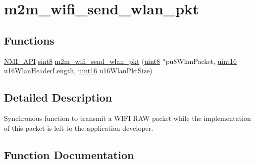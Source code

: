 \hypertarget{group__SendWlanPktFn}{}\section{m2m\+\_\+wifi\+\_\+send\+\_\+wlan\+\_\+pkt}
\label{group__SendWlanPktFn}
\subsection*{Functions}
\begin{DoxyCompactItemize}
\item 
\hyperlink{group__BSPDefine_gaecc0323d771e41ef81a76b5f12783e22}{N\+M\+I\+\_\+\+A\+PI} \hyperlink{group__DataT_gae35f10ffd0ac8dd2bc3e794da9bdfbc7}{sint8} \hyperlink{group__SendWlanPktFn_gaaa0ae5733351b8946ad3c6737ae768fe}{m2m\+\_\+wifi\+\_\+send\+\_\+wlan\+\_\+pkt} (\hyperlink{group__DataT_ga4df709a77647e870bbf1d955b8edc9a6}{uint8} $\ast$pu8\+Wlan\+Packet, \hyperlink{group__DataT_ga1daa745171fc6e31d942c161422a76f9}{uint16} u16\+Wlan\+Header\+Length, \hyperlink{group__DataT_ga1daa745171fc6e31d942c161422a76f9}{uint16} u16\+Wlan\+Pkt\+Size)
\end{DoxyCompactItemize}


\subsection{Detailed Description}
Synchronous function to transmit a W\+I\+FI R\+AW packet while the implementation of this packet is left to the application developer. 

\subsection{Function Documentation}
\mbox{\label{group__SendWlanPktFn_gaaa0ae5733351b8946ad3c6737ae768fe}} 
